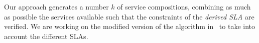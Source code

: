 Our approach  generates a number $k$ of service compositions, combining as much as possible the services available such that the constraints of the {\em derived SLA} are verified. 
We are working on the modified version of the algorithm in~\cite{CostaAMR13} to take into account the different SLAs. 
 